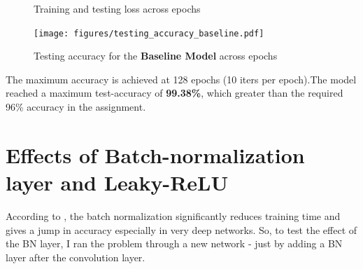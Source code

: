 \documentclass[a4paper]{article}
\begin{document}
\begin{figure}[htb]
	\centering
	\hfill
	\hfill
	\caption{Training and testing loss across epochs \label{fig:1}}
\end{figure}

\begin{figure}[htb]
	\centering
	\texttt{[image: figures/testing\_accuracy\_baseline.pdf]}
	\caption{Testing accuracy for the \textbf{Baseline Model} across epochs \label{fig:2}}
\end{figure}

The maximum accuracy is achieved at 128 epochs (10 iters per epoch).The model reached a maximum test-accuracy of \textbf{99.38\%}, which greater than the required 96\% accuracy in the assignment. 

\vspace{-10pt}

\section{Effects of Batch-normalization layer and Leaky-ReLU}
\vspace{-5pt}
According to \cite{bn}, the batch normalization significantly reduces training time and gives a jump in accuracy especially in very deep networks. So, to test the effect of the BN layer, I ran the problem through a new network - just by adding a BN layer after the convolution layer.
\end{document}
